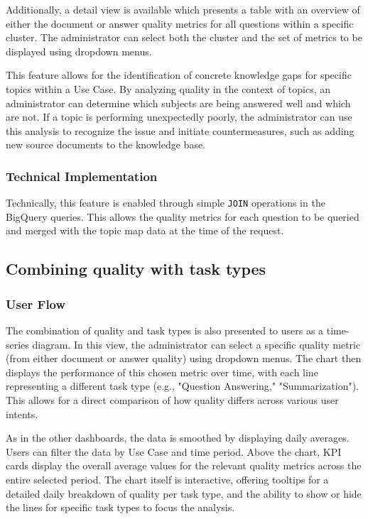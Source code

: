\documentclass[
	english,
	ruledheaders=section,%
	class=report,%
	thesis={type=bachelor},%
	accentcolor=1b,%
	custommargins=true,%
	marginpar=false,%
	parskip=half-,%
	fontsize=11pt,%
	DIV=14,
]{tudapub}
\begin{document}
Additionally, a detail view is available which presents a table with an overview of either the document or answer quality metrics for all questions within a specific cluster. The administrator can select both the cluster and the set of metrics to be displayed using dropdown menus.

This feature allows for the identification of concrete knowledge gaps for specific topics within a Use Case. By analyzing quality in the context of topics, an administrator can determine which subjects are being answered well and which are not. If a topic is performing unexpectedly poorly, the administrator can use this analysis to recognize the issue and initiate countermeasures, such as adding new source documents to the knowledge base.

\subsubsection{Technical Implementation}
Technically, this feature is enabled through simple \texttt{JOIN} operations in the BigQuery queries. This allows the quality metrics for each question to be queried and merged with the topic map data at the time of the request.
\subsection{Combining quality with task types}
\subsubsection{User Flow}
The combination of quality and task types is also presented to users as a time-series diagram. In this view, the administrator can select a specific quality metric (from either document or answer quality) using dropdown menus. The chart then displays the performance of this chosen metric over time, with each line representing a different task type (e.g., "Question Answering," "Summarization"). This allows for a direct comparison of how quality differs across various user intents.

As in the other dashboards, the data is smoothed by displaying daily averages. Users can filter the data by Use Case and time period. Above the chart, KPI cards display the overall average values for the relevant quality metrics across the entire selected period. The chart itself is interactive, offering tooltips for a detailed daily breakdown of quality per task type, and the ability to show or hide the lines for specific task types to focus the analysis.
\end{document}
